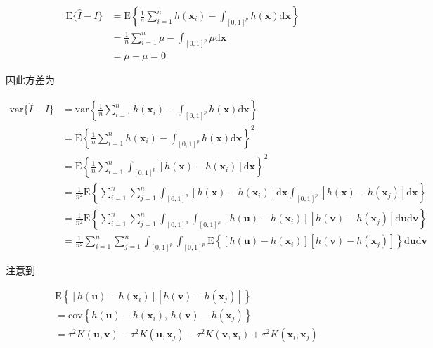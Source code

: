 \documentclass{ctexart}
\begin{document}
\begin{align*}
\mathrm{E}\{\widehat{I}-I\}&=\mathrm{E}\left\{\frac{1}{n}\sum_{i=1}^nh(\boldsymbol{x}_i)-\int_{[0,1]^p}h(\boldsymbol{x})\mathrm{d}\boldsymbol{x}\right\}\\
&=\frac{1}{n}\sum_{i=1}^n\mu-\int_{[0,1]^p}\mu \mathrm{d}\boldsymbol{x}\\
&=\mu-\mu=0
\end{align*}

因此方差为

\begin{align*}
\mathrm{var}\{\widehat{I}-I\}&=\mathrm{var}\left\{\frac{1}{n}\sum_{i=1}^nh(\boldsymbol{x}_i)-\int_{[0,1]^p}h(\boldsymbol{x})\mathrm{d}\boldsymbol{x}\right\}\\
&=\mathrm{E}\left\{\frac{1}{n}\sum_{i=1}^nh(\boldsymbol{x}_i)-\int_{[0,1]^p}h(\boldsymbol{x})\mathrm{d}\boldsymbol{x}\right\}^2\\
&=\mathrm{E}\left\{\frac{1}{n}\sum_{i=1}^n\int_{[0,1]^p}\left[h(\boldsymbol{x})-h(\boldsymbol{x}_i)\right]\mathrm{d}\boldsymbol{x}\right\}^2\\
&=\frac{1}{n^2}\mathrm{E}\left\{\sum_{i=1}^n\sum_{j=1}^n\int_{[0,1]^p}\left[h(\boldsymbol{x})-h(\boldsymbol{x}_i)\right]\mathrm{d}\boldsymbol{x}\int_{[0,1]^p}\left[h(\boldsymbol{x})-h(\boldsymbol{x}_j)\right]\mathrm{d}\boldsymbol{x}\right\}\\
&=\frac{1}{n^2}\mathrm{E}\left\{\sum_{i=1}^n\sum_{j=1}^n\int_{[0,1]^p}\int_{[0,1]^p}\left[h(\boldsymbol{u})-h(\boldsymbol{x}_i)\right]\left[h(\boldsymbol{v})-h(\boldsymbol{x}_j)\right]\mathrm{d}\boldsymbol{u}\mathrm{d}\boldsymbol{v}\right\}\\
&=\frac{1}{n^2}\sum_{i=1}^n\sum_{j=1}^n\int_{[0,1]^p}\int_{[0,1]^p}\mathrm{E}\left\{\left[h(\boldsymbol{u})-h(\boldsymbol{x}_i)\right]\left[h(\boldsymbol{v})-h(\boldsymbol{x}_j)\right]\right\}\mathrm{d}\boldsymbol{u}\mathrm{d}\boldsymbol{v}
\end{align*}

注意到

\begin{align*}
&\mathrm{E}\left\{\left[h(\boldsymbol{u})-h(\boldsymbol{x}_i)\right]\left[h(\boldsymbol{v})-h(\boldsymbol{x}_j)\right]\right\}\\
&=\mathrm{cov}\left\{h(\boldsymbol{u})-h(\boldsymbol{x}_i),\,h(\boldsymbol{v})-h(\boldsymbol{x}_j)\right\}\\
&=\tau^2K(\boldsymbol{u},\boldsymbol{v})-\tau^2K(\boldsymbol{u},\boldsymbol{x}_j)-\tau^2K(\boldsymbol{v},\boldsymbol{x}_i)+\tau^2K(\boldsymbol{x}_i,\boldsymbol{x}_j)
\end{align*}
\end{document}
